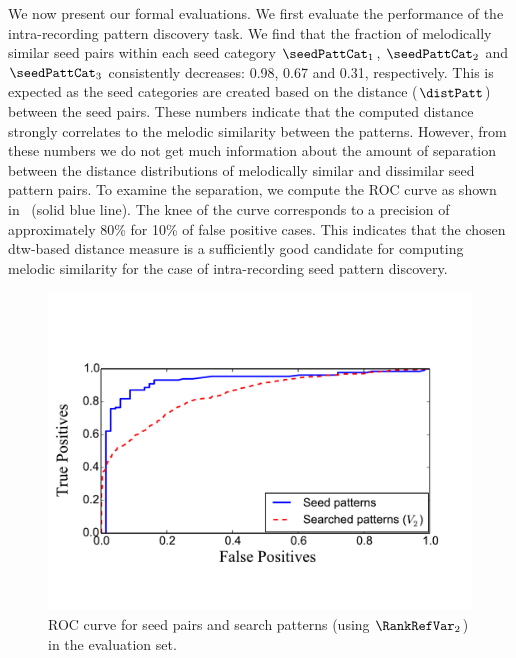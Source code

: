 We now present our formal evaluations. We first evaluate the performance of the intra-recording pattern discovery task. We find that the fraction of melodically similar seed pairs within each seed category $\seedPattCat_1$, $\seedPattCat_2$ and $\seedPattCat_3$ consistently decreases: 0.98, 0.67 and 0.31, respectively. This is expected as the seed categories are created based on the distance ($\distPatt$) between the seed pairs. These numbers indicate that the computed distance strongly correlates to the melodic similarity between the patterns. However, from these numbers we do not get much information about the amount of separation between the distance distributions of melodically similar and dissimilar seed pattern pairs. To examine the separation, we compute the ROC curve as shown in~ (solid blue line). The knee of the curve corresponds to a precision of approximately 80\% for 10\% of false positive cases. This indicates that the chosen \gls{dtw}-based distance measure is a sufficiently good candidate for computing melodic similarity for the case of intra-recording seed pattern discovery. 


\begin{figure}
	\begin{center}
		\includegraphics[width=\figSizeEightyFive]{ch06_patterns/figures/discovery/seedROC.pdf}
	\end{center}
	\caption{ROC curve for seed pairs and search patterns (using $\RankRefVar_2$) in the evaluation set.}%
	\label{fig:combinedROCPatternDiscovery}
\end{figure}


